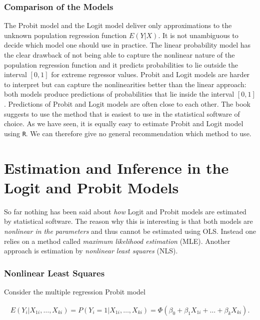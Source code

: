 \documentclass[]{book}
\theoremstyle{definition}
\theoremstyle{definition}
\theoremstyle{definition}
\theoremstyle{remark}
\begin{document}
\subsubsection*{Comparison of the
Models}\label{comparison-of-the-models}

The Probit model and the Logit model deliver only approximations to the
unknown population regression function \(E(Y\vert X)\). It is not
unambiguous to decide which model one should use in practice. The linear
probability model has the clear drawback of not being able to capture
the nonlinear nature of the population regression function and it
predicts probabilities to lie outside the interval \([0,1]\) for extreme
regressor values. Probit and Logit models are harder to interpret but
can capture the nonlinearities better than the linear approach: both
models produce predictions of probabilities that lie inside the interval
\([0,1]\). Predictions of Probit and Logit models are often close to
each other. The book suggests to use the method that is easiest to use
in the statistical software of choice. As we have seen, it is equally
easy to estimate Probit and Logit model using \texttt{R}. We can
therefore give no general recommendation which method to use.

\section{Estimation and Inference in the Logit and Probit
Models}\label{estimation-and-inference-in-the-logit-and-probit-models}

So far nothing has been said about \emph{how} Logit and Probit models
are estimated by statistical software. The reason why this is
interesting is that both models are \emph{nonlinear in the parameters}
and thus cannot be estimated using OLS. Instead one relies on a method
called \emph{maximum likelihood estimation} (MLE). Another approach is
estimation by \emph{nonlinear least squares} (NLS).

\subsubsection*{Nonlinear Least Squares}\label{nonlinear-least-squares}

Consider the multiple regression Probit model

\begin{align}
  E(Y_i\vert X_{1i}, \dots, X_{ki}) = P(Y_i=1\vert X_{1i}, \dots, X_{ki}) = \Phi(\beta_0 + \beta_1 X_{1i} + \dots + \beta_k X_{ki}). \label{eq:multprobit}
\end{align}
\end{document}
